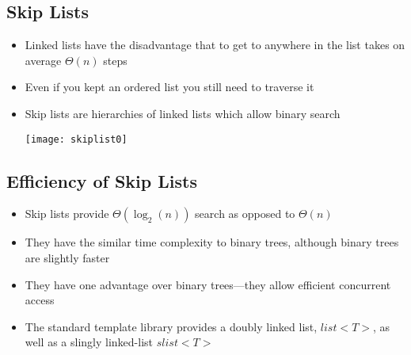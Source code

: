 \begin{slide}
\section{Skip Lists}
\pb

\begin{itemize}
\item Linked lists have the disadvantage that to get to anywhere in
  the list takes on average $\Theta(n)$ steps\pauseh
\item Even if you kept an ordered list you still need to traverse it\pauseh
\item Skip lists are hierarchies of linked lists which allow binary
  search
  \begin{center}
    \texttt{[image: skiplist0]}\pause
  \end{center}
\end{itemize}


\end{slide}


\begin{slide}
\section{Efficiency of Skip Lists}

\begin{PauseHighLight}
  \begin{itemize}
  \item Skip lists provide $\Theta(\log_2(n))$ search as opposed to
    $\Theta(n)$\pause
  \item They have the similar time complexity to binary trees, although
    binary trees are slightly faster\pause
  \item They have one advantage over binary trees---they allow efficient concurrent
    access\pause
  \item The standard template library provides a doubly linked list,
    \jl$list<T>$\pause, as well as a slingly linked-list \jl$slist<T>$\pauseb
  \end{itemize}
\end{PauseHighLight}

\end{slide}



